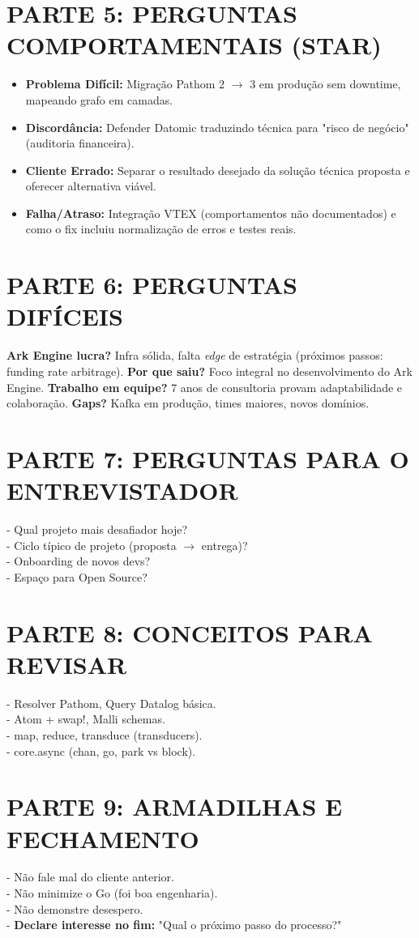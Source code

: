 \documentclass[10pt,a4paper]{article}
\begin{document}
\section*{PARTE 5: PERGUNTAS COMPORTAMENTAIS (STAR)}
\begin{itemize}
    \item \textbf{Problema Difícil:} Migração Pathom 2 $\to$ 3 em produção sem downtime, mapeando grafo em camadas.
    \item \textbf{Discordância:} Defender Datomic traduzindo técnica para "risco de negócio" (auditoria financeira).
    \item \textbf{Cliente Errado:} Separar o resultado desejado da solução técnica proposta e oferecer alternativa viável.
    \item \textbf{Falha/Atraso:} Integração VTEX (comportamentos não documentados) e como o fix incluiu normalização de erros e testes reais.
\end{itemize}

\section*{PARTE 6: PERGUNTAS DIFÍCEIS}
\textbf{Ark Engine lucra?} Infra sólida, falta \textit{edge} de estratégia (próximos passos: funding rate arbitrage).
\textbf{Por que saiu?} Foco integral no desenvolvimento do Ark Engine.
\textbf{Trabalho em equipe?} 7 anos de consultoria provam adaptabilidade e colaboração.
\textbf{Gaps?} Kafka em produção, times maiores, novos domínios.

\section*{PARTE 7: PERGUNTAS PARA O ENTREVISTADOR}
- Qual projeto mais desafiador hoje? \\
- Ciclo típico de projeto (proposta $\to$ entrega)? \\
- Onboarding de novos devs? \\
- Espaço para Open Source?

\section*{PARTE 8: CONCEITOS PARA REVISAR}
- Resolver Pathom, Query Datalog básica. \\
- Atom + swap!, Malli schemas. \\
- map, reduce, transduce (transducers). \\
- core.async (chan, go, park vs block).

\section*{PARTE 9: ARMADILHAS E FECHAMENTO}
- Não fale mal do cliente anterior. \\
- Não minimize o Go (foi boa engenharia). \\
- Não demonstre desespero. \\
- \textbf{Declare interesse no fim:} "Qual o próximo passo do processo?"
\end{document}
